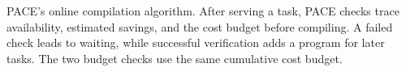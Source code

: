 \caption{PACE's online compilation algorithm.
After serving a task, PACE checks trace availability, estimated savings, and the cost budget before compiling.
A failed check leads to waiting, while successful verification adds a program for later tasks.
The two budget checks use the same cumulative cost budget.}

